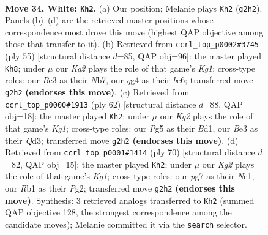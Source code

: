 \documentclass[11pt]{article}
\begin{document}
\clearpage

\begin{figure}[p]\centering
\begin{subfigure}{0.46\textwidth}\centering
\resizebox{\linewidth}{!}{%
\newchessgame
\chessboard[
  setfen={6nr/1kr3p1/8/2p1Q1Pp/2P2Pq1/N3B3/PP4K1/1R6 w - - 5 34},
  showmover=false,
  pgfstyle=straightmove, color=movearrow, markmove={g2-h2}
]}
\caption{}
\end{subfigure}\hfill
\begin{subfigure}{0.46\textwidth}\centering
\resizebox{\linewidth}{!}{%
\newchessgame
\chessboard[
  setfen={1r4k1/pnq3p1/4B2p/2P1p3/8/2Q1pPb1/P5P1/K2R3R b - - 0 28},
  showmover=false,
  pgfstyle=straightmove, color=movearrow, markmove={g8-h8}
]}
\caption{}
\end{subfigure}
\\[4pt]
\begin{subfigure}{0.46\textwidth}\centering
\resizebox{\linewidth}{!}{%
\newchessgame
\chessboard[
  setfen={1k5r/1p6/p1n2r2/3p1pN1/5R1P/P2QP1P1/1q4P1/3B2K1 w - - 0 32},
  showmover=false,
  pgfstyle=straightmove, color=movearrow, markmove={g1-h2}
]}
\caption{}
\end{subfigure}\hfill
\begin{subfigure}{0.46\textwidth}\centering
\resizebox{\linewidth}{!}{%
\newchessgame
\chessboard[
  setfen={k2rr3/p1R5/1p2p3/1P2Q1pp/3P4/6P1/5PP1/1q2N1K1 w - - 4 36},
  showmover=false,
  pgfstyle=straightmove, color=movearrow, markmove={g1-h2}
]}
\caption{}
\end{subfigure}
\caption{\textbf{Move 34, White: \texttt{Kh2}.} (a) Our position; Melanie plays \texttt{Kh2} (\texttt{g2h2}). Panels (b)--(d) are the retrieved master positions whose correspondence most drove this move (highest QAP objective among those that transfer to it). (b) Retrieved from \texttt{ccrl\_top\_p0002\#3745} (ply 55) [structural distance $d$=85, QAP obj=96]: the master played \texttt{Kh8}; under $\mu$ our \emph{Kg2} plays the role of that game's \emph{Kg1}; cross-type roles: our \emph{B}e3 as their \emph{N}b7, our \emph{q}g4 as their \emph{b}e6; transferred move \texttt{g2h2} \textbf{(endorses this move)}. (c) Retrieved from \texttt{ccrl\_top\_p0000\#1913} (ply 62) [structural distance $d$=88, QAP obj=18]: the master played \texttt{Kh2}; under $\mu$ our \emph{Kg2} plays the role of that game's \emph{Kg1}; cross-type roles: our \emph{P}g5 as their \emph{B}d1, our \emph{B}e3 as their \emph{Q}d3; transferred move \texttt{g2h2} \textbf{(endorses this move)}. (d) Retrieved from \texttt{ccrl\_top\_p0001\#1414} (ply 70) [structural distance $d$=82, QAP obj=15]: the master played \texttt{Kh2}; under $\mu$ our \emph{Kg2} plays the role of that game's \emph{Kg1}; cross-type roles: our \emph{p}g7 as their \emph{N}e1, our \emph{R}b1 as their \emph{P}g2; transferred move \texttt{g2h2} \textbf{(endorses this move)}. Synthesis: 3 retrieved analogs transferred to \texttt{Kh2} (summed QAP objective 128, the strongest correspondence among the candidate moves); Melanie committed it via the \texttt{search} selector.}
\label{fig:thought-m66}
\end{figure}
\end{document}
